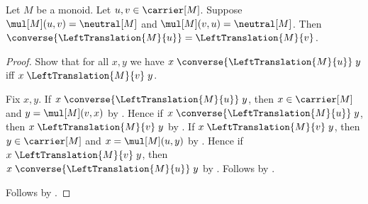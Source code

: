 \begin{lemma}\label{monoid_unit_left_translation_converse}
    Let $M$ be a monoid.
    Let $u,v\in\carrier[M]$.
    Suppose $\mul[M](u,v)=\neutral[M]$ and
        $\mul[M](v,u)=\neutral[M]$.
    Then $\converse{\LeftTranslation{M}{u}}
        =\LeftTranslation{M}{v}$.
\end{lemma}
\begin{proof}
    Show that for all $x,y$ we have
        $x\mathrel{\converse{\LeftTranslation{M}{u}}}y$ iff
        $x\mathrel{\LeftTranslation{M}{v}}y$.
    \begin{subproof}
        Fix $x,y$.
        If $x\mathrel{\converse{\LeftTranslation{M}{u}}}y$, then
            $x\in\carrier[M]$ and $y=\mul[M](v,x)$ by
            .
        Hence if $x\mathrel{\converse{\LeftTranslation{M}{u}}}y$, then
            $x\mathrel{\LeftTranslation{M}{v}}y$
            by .
        If $x\mathrel{\LeftTranslation{M}{v}}y$, then
            $y\in\carrier[M]$ and $x=\mul[M](u,y)$ by
            .
        Hence if $x\mathrel{\LeftTranslation{M}{v}}y$, then
            $x\mathrel{\converse{\LeftTranslation{M}{u}}}y$
            by .
        Follows by \auto.
    \end{subproof}
    Follows by
        .
\end{proof}

